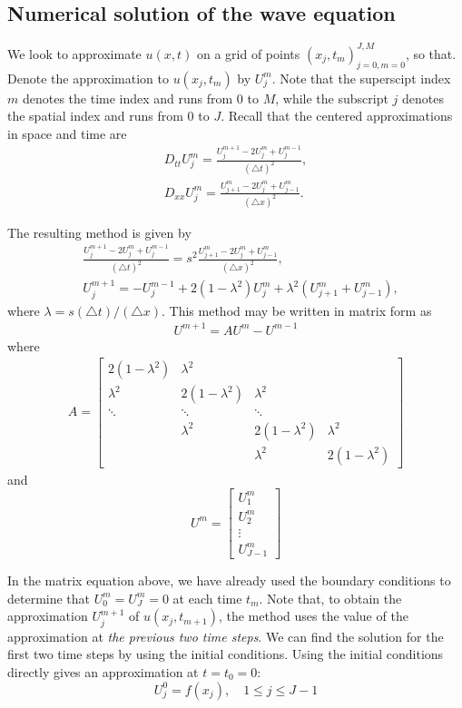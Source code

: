 \subsection*{Numerical solution of the wave equation}
We look to approximate $u(x,t)$ on a grid of points $(x_j,t_m)_{j=0,m=0}^{J,M}$, so that.
Denote the approximation to $u(x_j,t_m)$ by $U_{j}^{m}$.
Note that the superscipt index $m$ denotes the time index and runs from $0$ to $M$, while the subscript $j$ denotes the spatial index and runs from $0$ to $J$.
Recall that the centered approximations in space and time are
\begin{align*}
D_{tt} U_{j}^{m} = \frac{U_{j}^{m+1} -2 U_{j}^{m} + U_{j}^{m-1}}{(\triangle t)^2} ,\\
D_{xx} U_{j}^{m} = \frac{U_{j+1}^{m} -2 U_{j}^{m} + U_{j-1}^{m}}{(\triangle x)^2} .
\end{align*}

The resulting method is given by
\begin{align*}
	&\frac{U_{j}^{m+1} -2 U_{j}^{m} + U_{j}^{m-1}}{(\triangle t)^2} = s^2 \frac{U_{j+1}^{m} -2 U_{j}^{m} + U_{j-1}^{m}}{(\triangle x)^2}, \\
	&U_{j}^{m+1} =  - U_{j}^{m-1} + 2 (1-\lambda^2) U_{j}^{m} + \lambda ^2 (U_{j+1}^{m} + U_{j-1}^{m}),
\end{align*}
where $ \lambda  =  s(\triangle t)/(\triangle x)$.
This method may be written in matrix form as
\begin{align}
U^{m+1} = AU^{m} - U^{m-1} 
\end{align}
where
\begin{align}
A =
\left[\begin{array}{cccc}2(1-\lambda^2) & \lambda^2 &  &  \\ \lambda^2 & 2(1-\lambda^2) & \lambda^2 &  \\ \ddots & \ddots & \ddots &  \\ & \lambda^2 & 2(1-\lambda^2) & \lambda^2 \\  &  & \lambda^2 & 2(1-\lambda^2)\end{array}\right]
\end{align}
and
\[U^m = \left[\begin{array}{c}U_{1}^{m} \\U_{2}^{m} \\\vdots \\U_{J-1}^{m}\end{array}\right]\]

In the matrix equation above, we have already used the boundary conditions to determine that $U_{0}^{m} = U_{J}^{m} = 0$ at each time $t_m$.
Note that, to obtain the approximation $U_{j}^{m+1}$ of $u(x_j,t_{m+1})$, the method uses the value of the approximation at \emph{the previous two time steps}.
We can find the solution for the first two time steps by using the initial conditions.
Using the initial conditions directly gives an approximation at $t = t_0 = 0:$
\[U_{j}^{0} = f(x_j), \quad 1 \leq j \leq J-1\]

